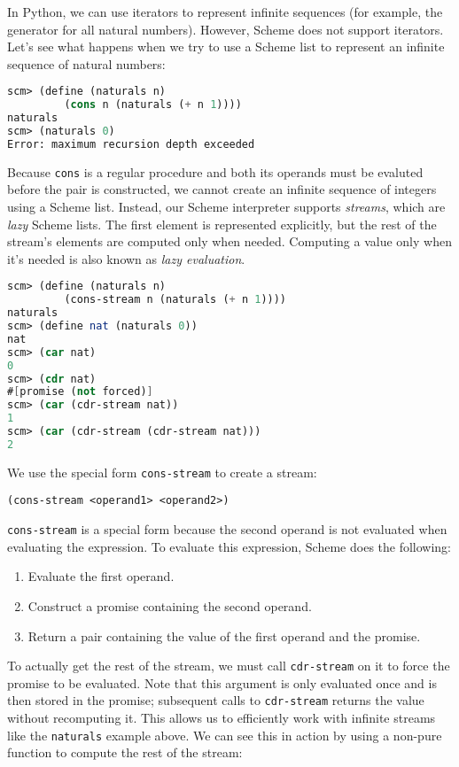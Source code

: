 In Python, we can use iterators to represent infinite sequences (for example,
the generator for all natural numbers). However, Scheme does not support
iterators. Let's see what happens when we try to use a Scheme list to represent
an infinite sequence of natural numbers:

\begin{lstlisting}[language=Scheme]
scm> (define (naturals n)
         (cons n (naturals (+ n 1))))
naturals
scm> (naturals 0)
Error: maximum recursion depth exceeded
\end{lstlisting}

Because \texttt{cons} is a regular procedure and both its operands must be
evaluted before the pair is constructed, we cannot create an infinite sequence
of integers using a Scheme list.
Instead, our Scheme interpreter supports \textit{streams}, which are
\textit{lazy} Scheme lists. The first element is represented explicitly, but the
rest of the stream's elements are computed only when needed. Computing a value
only when it's needed is also known as \textit{lazy evaluation}.

\begin{lstlisting}[language=Scheme]
scm> (define (naturals n)
         (cons-stream n (naturals (+ n 1))))
naturals
scm> (define nat (naturals 0))
nat
scm> (car nat)
0
scm> (cdr nat)
#[promise (not forced)]
scm> (car (cdr-stream nat))
1
scm> (car (cdr-stream (cdr-stream nat)))
2
\end{lstlisting}
We use the special form \texttt{cons-stream} to create a stream:

\centerline{\lstinline{(cons-stream <operand1> <operand2>)}}

\texttt{cons-stream} is a special form because the second operand is not
evaluated when evaluating the expression. To evaluate this expression, Scheme
does the following:

\begin{enumerate}
\item Evaluate the first operand.
\item Construct a promise containing the second operand.
\item Return a pair containing the value of the first operand and the promise.
\end{enumerate}

To actually get the rest of the stream, we must call \texttt{cdr-stream} on it
to force the promise to be evaluated.  Note that this argument is only
evaluated once and is then stored in the promise; subsequent calls to
\texttt{cdr-stream} returns the value without recomputing it. This allows us to
efficiently work with infinite streams like the \texttt{naturals} example
above. We can see this in action by using a non-pure function to compute the
rest of the stream:

